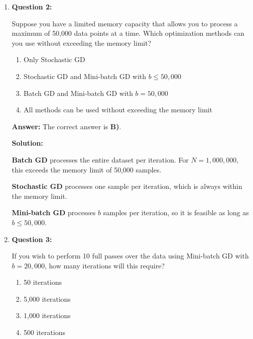 \documentclass{article}
\begin{document}
\begin{enumerate}
In \textbf{Stochastic GD}, one iteration uses \emph{one} training example. Therefore, \textbf{one epoch} requires
\[
N = 1{,}000{,}000 \text{ iterations.}
\]

In \textbf{Mini-batch GD} with batch size \(b = 10{,}000\), one iteration processes one batch. The number of batches per epoch is
\[
\frac{N}{b} \;=\; \frac{1{,}000{,}000}{10{,}000} \;=\; 100,
\]
so \textbf{one epoch} requires \textbf{100 iterations}.

\vspace{6pt}

\item \textbf{Question 2:}

Suppose you have a limited memory capacity that allows you to process a maximum of 50{,}000 data points at a time. Which optimization methods can you use without exceeding the memory limit?
\begin{enumerate}
    \item Only Stochastic GD
    \item Stochastic GD and Mini-batch GD with \( b \leq 50{,}000 \)
    \item Batch GD and Mini-batch GD with \( b = 50{,}000 \)
    \item All methods can be used without exceeding the memory limit
\end{enumerate}

\textbf{Answer:} The correct answer is \textbf{B)}.

\textbf{Solution:}

\textbf{Batch GD} processes the entire dataset per iteration. For \(N=1{,}000{,}000\), this exceeds the memory limit of 50{,}000 samples.

\textbf{Stochastic GD} processes one sample per iteration, which is always within the memory limit.

\textbf{Mini-batch GD} processes \(b\) samples per iteration, so it is feasible as long as \(b \le 50{,}000\).

\vspace{6pt}

\item \textbf{Question 3:}

If you wish to perform 10 full passes over the data using Mini-batch GD with \( b = 20{,}000 \), how many iterations will this require?
\begin{enumerate}
    \item 50 iterations
    \item 5{,}000 iterations
    \item 1{,}000 iterations
    \item 500 iterations
\end{enumerate}


\end{enumerate}
\end{document}
